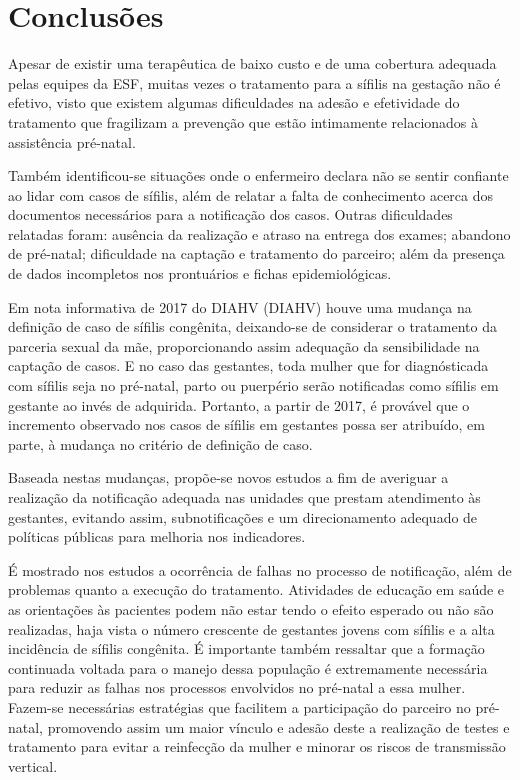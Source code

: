 \chapter{Conclusões}
\label{chap:conclusoes-e-trabalhos-futuros}

Apesar de existir uma terapêutica de baixo custo e de uma cobertura adequada pelas equipes da \acrshort{ESF}, muitas vezes o tratamento para a sífilis na gestação não é efetivo, visto que existem algumas dificuldades na adesão e efetividade do tratamento que fragilizam a prevenção que estão intimamente relacionados à assistência pré-natal.

Também identificou-se situações onde o enfermeiro declara não se sentir confiante ao lidar com casos de sífilis, além de relatar a falta de conhecimento acerca dos documentos necessários para a notificação dos casos. Outras dificuldades relatadas foram: ausência da realização e atraso na entrega dos exames; abandono de pré-natal; dificuldade na captação e tratamento do parceiro; além da presença de dados incompletos nos prontuários e fichas epidemiológicas.

Em nota informativa de 2017 do \acrlong{DIAHV} (\acrshort{DIAHV}) houve uma mudança na definição de caso de sífilis congênita, deixando-se de considerar o tratamento da parceria sexual da mãe, proporcionando assim adequação da sensibilidade na captação de casos. E no caso das gestantes, toda mulher que for diagnósticada com sífilis seja no pré-natal, parto ou puerpério serão notificadas como sífilis em gestante ao invés de adquirida. Portanto, a partir de 2017, é provável que o incremento observado nos casos de sífilis em gestantes possa ser atribuído, em parte, à mudança no critério de definição de caso. \cite{boletim2018}

Baseada nestas mudanças, propõe-se novos estudos a fim de averiguar a realização da notificação adequada nas unidades que prestam atendimento às gestantes, evitando assim, subnotificações e um direcionamento adequado de políticas públicas para melhoria nos indicadores. 
			
É mostrado nos estudos a ocorrência de falhas no processo de notificação, além de problemas quanto a execução do tratamento. Atividades de educação em saúde e as orientações às pacientes podem não estar tendo o efeito esperado ou não são realizadas, haja vista o número crescente de gestantes jovens com sífilis e a alta incidência de sífilis congênita. É importante também ressaltar que a formação continuada voltada para o manejo dessa população é extremamente necessária para reduzir as falhas nos processos envolvidos no pré-natal a essa mulher. Fazem-se necessárias estratégias que facilitem a participação do parceiro no pré-natal, promovendo assim um maior vínculo e adesão deste a realização de testes e tratamento para evitar a reinfecção da mulher e minorar os riscos de transmissão vertical.
 
